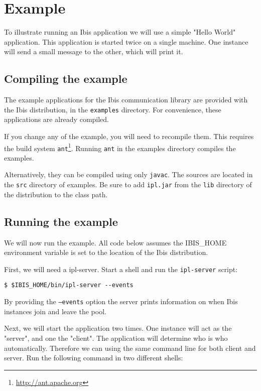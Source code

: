 \documentclass[a4paper,10pt]{article}
\begin{document}
\section{Example}

To illustrate running an Ibis application we will use a simple "Hello
World" application. This application is started twice on a single
machine. One instance will send a small message to the other, which will
print it.

\subsection{Compiling the example}

The example applications for the Ibis communication library are
provided with the Ibis distribution, in the \texttt{examples} directory.
For convenience, these applications are already compiled. 

If you change any of the example, you will need to recompile them. This 
requires the build system \texttt{ant}\footnote{\url{http://ant.apache.org}}. 
Running \texttt{ant} in the examples directory compiles the examples.

Alternatively, they can be compiled using only \texttt{javac}. The sources are
located in the \texttt{src} directory of examples. Be sure to add \texttt{ipl.jar} 
from the \texttt{lib} directory of the distribution to the class path.

\subsection{Running the example}

We will now run the example. All code below assumes the IBIS\_HOME
environment variable is set to the location of the Ibis distribution.

First, we will need a ipl-server. Start a shell and
run the \texttt{ipl-server} script:
\noindent
{\small
\begin{verbatim}
$ $IBIS_HOME/bin/ipl-server --events
\end{verbatim}
}
\noindent

By providing the \texttt{--events} option the server 
prints information on when Ibis instances join and leave the pool.

Next, we will start the application two times. One instance will act as the
"server", and one the "client". The application will determine who is who
automatically. Therefore we can using the same command line for both client 
and server. Run the following command in two different shells:
\end{document}
